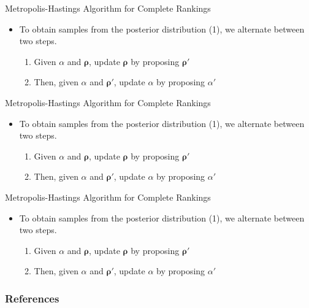 \documentclass[11pt]{beamer}
\begin{document}
\begin{frame}{Metropolis-Hastings Algorithm for Complete Rankings}
\begin{itemize}
    \item To obtain samples from the posterior distribution (1), we alternate between two steps.
    \begin{enumerate}
        \item Given $\alpha$ and $\boldsymbol{\rho}$, update $\boldsymbol{\rho}$ by proposing $\boldsymbol{\rho}'$
        \item Then, given $\alpha$ and $\boldsymbol{\rho}'$, update $\alpha$ by proposing $\alpha'$
    \end{enumerate}
\end{itemize}
\end{frame}

\begin{frame}{Metropolis-Hastings Algorithm for Complete Rankings}
\begin{itemize}
    \item To obtain samples from the posterior distribution (1), we alternate between two steps.
    \begin{enumerate}
        \item Given $\alpha$ and $\boldsymbol{\rho}$, update $\boldsymbol{\rho}$ by proposing $\boldsymbol{\rho}'$
        \item Then, given $\alpha$ and $\boldsymbol{\rho}'$, update $\alpha$ by proposing $\alpha'$
    \end{enumerate}
\end{itemize}
\end{frame}

\begin{frame}{Metropolis-Hastings Algorithm for Complete Rankings}
\begin{itemize}
    \item To obtain samples from the posterior distribution (1), we alternate between two steps.
    \begin{enumerate}
        \item Given $\alpha$ and $\boldsymbol{\rho}$, update $\boldsymbol{\rho}$ by proposing $\boldsymbol{\rho}'$
        \item Then, given $\alpha$ and $\boldsymbol{\rho}'$, update $\alpha$ by proposing $\alpha'$
    \end{enumerate}
\end{itemize}
\end{frame}


\begin{frame}[t, allowframebreaks]
\frametitle{References}


\end{frame}
\end{document}
